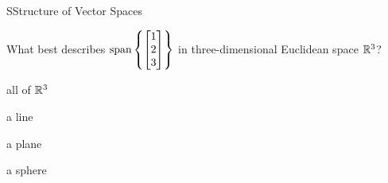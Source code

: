 \documentclass{article}[12pt]
\begin{document}
\begin{module}{S}{Structure of Vector Spaces}
\begin{readinessAssuranceTest}
  \item What best describes \(\operatorname{span}\left\{
  \begin{bmatrix}
    1 \\ 2 \\ 3
  \end{bmatrix}\right\}\) in three-dimensional Euclidean space \(\mathbb{R}^3\)?
    \begin{multicols}{4}
    \begin{readinessAssuranceTestChoices}
    \item all of \(\mathbb{R}^3\)
      \item a line %
      \item a plane
      \item a sphere
    \end{readinessAssuranceTestChoices}
    \end{multicols}



  \end{readinessAssuranceTest}

\end{module}
\end{document}

